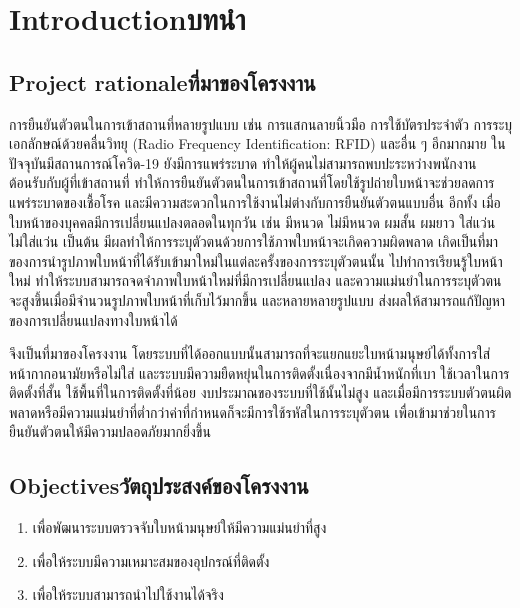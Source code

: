 \chapter{\ifenglish Introduction\else บทนำ\fi}

\section{\ifenglish Project rationale\else ที่มาของโครงงาน\fi}
การยืนยันตัวตนในการเข้าสถานที่หลายรูปแบบ เช่น การแสกนลายนิ้วมือ การใช้บัตรประจำตัว  การระบุเอกลักษณ์ด้วยคลื่นวิทยุ (Radio Frequency Identification: RFID) และอื่น ๆ อีกมากมาย 
ในปัจจุบันมีสถานการณ์โควิด-19 ยังมีการแพร่ระบาด ทำให้ผู้คนไม่สามารถพบปะระหว่างพนักงานต้อนรับกับผู้ที่เข้าสถานที่ 
ทำให้การยืนยันตัวตนในการเข้าสถานที่โดยใช้รูปถ่ายใบหน้าจะช่วยลดการแพร่ระบาดของเชื้อโรค และมีความสะดวกในการใช้งานไม่ต่างกับการยืนยันตัวตนแบบอื่น อีกทั้ง
เมื่อใบหน้าของบุคคลมีการเปลี่ยนแปลงตลอดในทุกวัน เช่น มีหนวด ไม่มีหนวด ผมสั้น ผมยาว ใส่แว่น ไม่ใส่แว่น เป็นต้น
มีผลทำให้การระบุตัวตนด้วยการใช้ภาพใบหน้าจะเกิดความผิดพลาด เกิดเป็นที่มาของการนำรูปภาพใบหน้าที่ได้รับเข้ามาใหม่ในแต่ละครั้งของการระบุตัวตนนั้น 
ไปทำการเรียนรู้ใบหน้าใหม่ ทำให้ระบบสามารถจดจำภาพใบหน้าใหม่ที่มีการเปลี่ยนแปลง 
และความแม่นยำในการระบุตัวตนจะสูงขึ้นเมื่อมีจำนวนรูปภาพใบหน้าที่เก็บไว้มากขึ้น และหลายหลายรูปแบบ ส่งผลให้สามารถแก้ปัญหาของการเปลี่ยนแปลงทางใบหน้าได้ 

\indent จึงเป็นที่มาของโครงงาน โดยระบบที่ได้ออกแบบนั้นสามารถที่จะแยกแยะใบหน้ามนุษย์ได้ทั้งการใส่หน้ากากอนามัยหรือไม่ใส่ และระบบมีความยืดหยุ่นในการติดตั้งเนื่องจากมีน้ำหนักที่เบา
ใช้เวลาในการติดตั้งที่สั้น ใช้พื้นที่ในการติดตั้งที่น้อย งบประมาณของระบบที่ใช้นั้นไม่สูง และเมื่อมีการระบบตัวตนผิดพลาดหรือมีความแม่นยำที่ต่ำกว่าค่าที่กำหนดก็จะมีการใช้รหัสในการระบุตัวตน
เพื่อเข้ามาช่วยในการยืนยันตัวตนให้มีความปลอดภัยมากยิ่งขึ้น

\section{\ifenglish Objectives\else วัตถุประสงค์ของโครงงาน\fi}
\begin{enumerate}
    \item เพื่อพัฒนาระบบตรวจจับใบหน้ามนุษย์ให้มีความแม่นยำที่สูง
    \item เพื่อให้ระบบมีความเหมาะสมของอุปกรณ์ที่ติดตั้ง
    \item เพื่อให้ระบบสามารถนำไปใช้งานได้จริง
\end{enumerate}

